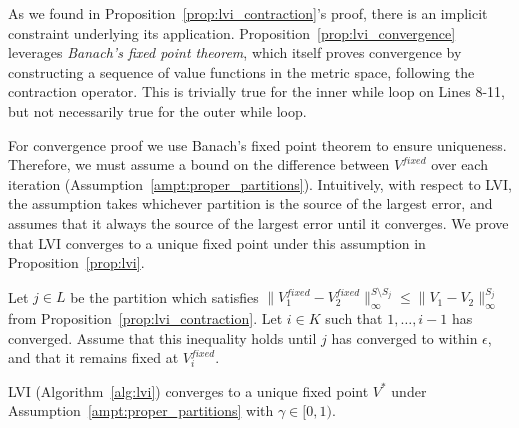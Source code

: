 As we found in Proposition~\ref{prop:lvi_contraction}'s proof, there is an implicit constraint underlying its application. Proposition~\ref{prop:lvi_convergence} leverages \emph{Banach's fixed point theorem}, which itself proves convergence by constructing a sequence of value functions in the metric space, following the contraction operator. This is trivially true for the inner while loop on Lines 8-11, but not necessarily true for the outer while loop.

For convergence proof we use Banach's fixed point theorem to ensure uniqueness. Therefore, we must assume a bound on the difference between $V^{fixed}$ over each iteration (Assumption~\ref{ampt:proper_partitions}). Intuitively, with respect to LVI, the assumption takes whichever partition is the source of the largest error, and assumes that it always the source of the largest error until it converges. We prove that LVI converges to a unique fixed point under this assumption in Proposition~\ref{prop:lvi}.


\begin{assumption}
    \label{ampt:proper_partitions}
    Let $j \in L$ be the partition which satisfies $\| V_1^{fixed} - V_2^{fixed} \|_\infty^{S \setminus S_j} \leq \| V_1 - V_2 \|_\infty^{S_j}$ from Proposition~\ref{prop:lvi_contraction}. Let $i \in K$ such that $1, \ldots, i - 1$ has converged. Assume that this inequality holds until $j$ has converged to within $\epsilon$, and that it remains fixed at $V_i^{fixed}$.
\end{assumption}


\begin{proposition}
    \label{prop:lvi}
    LVI (Algorithm~\ref{alg:lvi}) converges to a unique fixed point $V^*$ under Assumption~\ref{ampt:proper_partitions} with $\gamma \in [0, 1)$.
\end{proposition}


